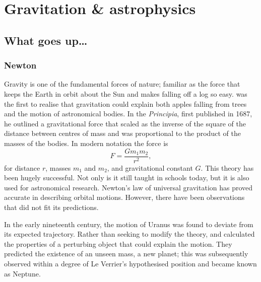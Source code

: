 \chapter{Gravitation \& astrophysics}

\section{What goes up\ldots}

\subsection{Newton}

Gravity is one of the fundamental forces of nature; familiar as the force that keeps the Earth in orbit about the Sun and makes falling off a log so easy. \citet[book 3]{Newton1999} was the first to realise that gravitation could explain both apples falling from trees and the motion of astronomical bodies. In the \textit{Principia}, first published in 1687, he outlined a gravitational force that scaled as the inverse of the square of the distance between centres of mass and was proportional to the product of the masses of the bodies. In modern notation the force is
\begin{equation}
F = \frac{G m_1 m_2}{r^2},
\end{equation}
for distance $r$, masses $m_1$ and $m_2$, and gravitational constant $G$. This theory has been hugely successful. Not only is it still taught in schools today, but it is also used for astronomical research. Newton's law of universal gravitation has proved accurate in describing orbital motions. However, there have been observations that did not fit its predictions.

In the early nineteenth century, the motion of Uranus was found to deviate from its expected trajectory. Rather than seeking to modify the theory, \citet[\textit{troisi{\`e}me partie}]{LeVerrier1846} and \citet[papers 1 and 2]{Adams1896} calculated the properties of a perturbing object that could explain the motion. They predicted the existence of an unseen mass, a new planet; this was subsequently observed within a degree of Le Verrier's hypothesised position \citep[\textit{cinqui{\`e}me partie}]{LeVerrier1846} and became known as Neptune.

